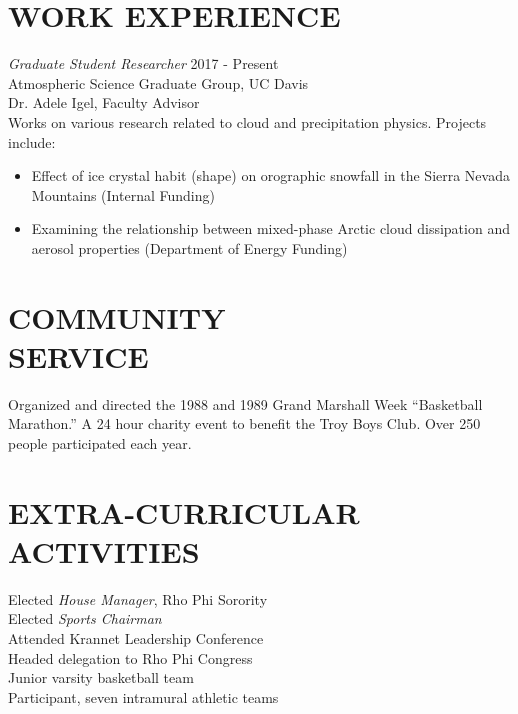 \documentclass[margin]{res}
\begin{document}
\begin{resume}
\section{WORK EXPERIENCE} 
                {\sl Graduate Student Researcher} \hfill 2017 - Present \\
                Atmospheric Science Graduate Group, UC Davis \\
                Dr. Adele Igel, Faculty Advisor \\
                Works on various research related to cloud and precipitation physics. Projects include:
                \begin{itemize} \itemsep -2pt
                    \item Effect of ice crystal habit (shape) on orographic snowfall in the Sierra Nevada Mountains (Internal Funding)
                    \item Examining the relationship between mixed-phase Arctic cloud dissipation and aerosol properties (Department of Energy Funding)
                \end{itemize}

                {\sl}

 
\section{COMMUNITY \\ SERVICE}  Organized and directed the 1988 and 1989 Grand 
                 Marshall Week \newline ``Basketball Marathon.'' A 24 hour 
                charity event to benefit the Troy Boys Club. Over 
                250 people participated each year. 

\section{EXTRA-CURRICULAR \\ ACTIVITIES}             
            Elected {\it House Manager}, Rho Phi Sorority \\
            Elected {\it Sports Chairman} \\
            Attended Krannet Leadership Conference \\
                Headed delegation to Rho Phi Congress \\
                Junior varsity basketball team \\
                Participant, seven intramural athletic teams 
 

\end{resume}
\end{document}
